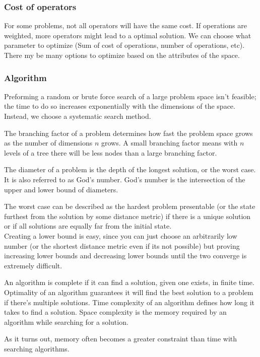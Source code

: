 \documentclass{chezarticle}
\begin{document}
\subsubsection{Cost of operators}
For some problems, not all operators will have the same cost. If operations are weighted, more operators might lead to a optimal solution. We can choose what parameter to optimize (Sum of cost of operations, number of operations, etc). There my be many options to optimize based on the attributes of the space.
\subsubsection{Algorithm}
Preforming a random or brute force search of a large problem space isn't feasible; the time to do so increases exponentially with the dimensions of the space. Instead, we choose a systematic search method. 
\begin{definition}
The branching factor of a problem determines how fast the problem space grows as the number of dimensions $n$ grows. A small branching factor means with $n$ levels of a tree there will be less nodes than a large branching factor.
\end{definition}
\begin{definition}
The diameter of a problem is the depth of the longest solution, or the worst case. It is also referred to as God's number. God's number is the intersection of the upper and lower bound of diameters. 
\end{definition}
The worst case can be described as the hardest problem presentable (or the state furthest from the solution by some distance metric) if there is a unique solution or if all solutions are equally far from the initial state.
\\
Creating a lower bound is easy, since you can just choose an arbitrarily low number (or the shortest distance metric even if its not possible) but proving increasing lower bounds and decreasing lower bounds until the two converge is extremely difficult. 
\begin{definition}
An algorithm is complete if it can find a solution, given one exists, in finite time. Optimality of an algorithm guarantees it will find the best solution to a problem if there's multiple solutions. Time complexity of an algorithm defines how long it takes to find a solution. Space complexity is the memory required by an algorithm while searching for a solution.
\end{definition}
As it turns out, memory often becomes a greater constraint than time with searching algorithms. 
\end{document}
